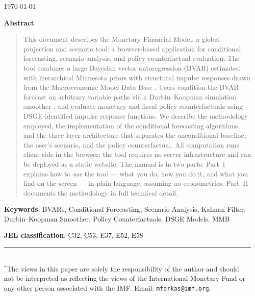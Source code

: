 \documentclass[11pt]{article}
\theoremstyle{definition}
\theoremstyle{remark}
\begin{document}
\vspace{0.3cm}
\begin{center}
\today
\end{center}

\vspace{1cm}

\begin{center}\textbf{Abstract}\end{center}
\begin{quote}
This document describes the Monetary-Financial Model, a global
projection and scenario tool: a browser-based application for
conditional forecasting, scenario analysis, and policy
counterfactual evaluation.  The tool combines a large Bayesian vector
autoregression (BVAR) estimated with hierarchical Minnesota priors
\citep{Giannone2015} with structural impulse responses drawn from the
Macroeconomic Model Data Base
\citep[MMB;][]{WielandCwikMuellerSchmidtWolters2012,
WielandAfanasyevaYooKuete2016}.  Users condition the BVAR forecast on
arbitrary variable paths via a Durbin--Koopman simulation smoother
\citep{DurbinKoopman2002, DurbinKoopman2012}, and evaluate monetary and
fiscal policy counterfactuals using DSGE-identified impulse response
functions.  We describe the methodology employed, the implementation of
the conditional forecasting algorithms, and the three-layer architecture
that separates the unconditional baseline, the user's scenario, and the
policy counterfactual.  All computation runs client-side in the browser;
the tool requires no server infrastructure and can be deployed as a
static website.  The manual is in two parts: Part~I explains how to
\emph{use} the tool --- what you do, how you do it, and what you find
on the screen --- in plain language, assuming no econometrics; Part~II
documents the methodology in full technical detail.
\end{quote}

\vspace{0.5cm}
\noindent\textbf{Keywords}: BVARs, Conditional Forecasting, Scenario
Analysis, Kalman Filter, Durbin--Koopman Smoother, Policy
Counterfactuals, DSGE Models, MMB

\vspace{0.3cm}
\noindent\textbf{JEL classification}: C32, C53, E37, E52, E58

\vfill
\noindent\rule{\textwidth}{0.4pt}\\[4pt]
{\footnotesize $^*$The views in this paper are solely the
responsibility of the author and should not be interpreted as reflecting
the views of the International Monetary Fund or any other person
associated with the IMF.  Email: \texttt{mfarkas@imf.org}.}
\end{document}
